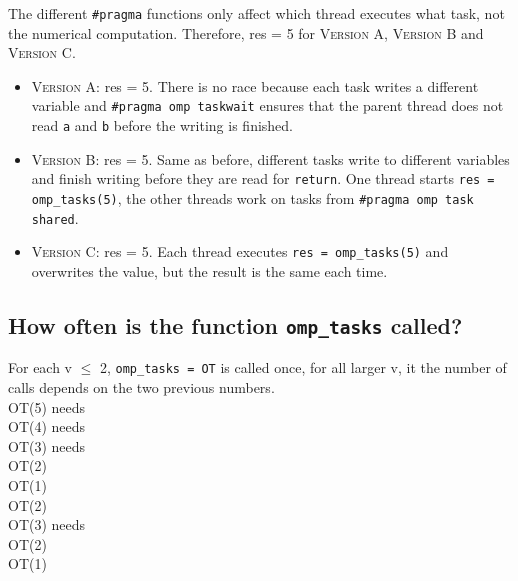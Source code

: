 \documentclass[a4paper,%
11pt,%
DIV12,
headsepline,%
headings=normal,
]{scrartcl}
\begin{document}
The different \texttt{\#pragma} functions only affect which thread executes what task, not the numerical computation. Therefore, res = 5 for \textsc{Version A}, \textsc{Version B} and \textsc{Version C}.

\begin{itemize}
	\item \textsc{Version A}: res = 5. There is no race because each task writes a different variable and \texttt{\#pragma omp taskwait} ensures that the parent thread does not read \texttt{a} and \texttt{b} before the writing is finished.
	\item \textsc{Version B}:  res = 5. Same as before, different tasks write to different variables and finish writing before they are read for \texttt{return}. One thread starts \texttt{res = omp\_tasks(5)}, the other threads work on tasks from \texttt{\#pragma omp task shared}.
	\item \textsc{Version C}:  res = 5. Each thread executes \texttt{res = omp\_tasks(5)} and overwrites the value, but the result is the same each time. 
\end{itemize}  

\subsection{How often is the function \texttt{omp\_tasks} called?}

For each v $\leq$ 2, \texttt{omp\_tasks = OT} is called once, for all larger v, it the number of calls depends on the two previous numbers. \\
OT(5) needs\\
\hspace*{5mm} OT(4) needs\\
\hspace*{10mm} OT(3) needs\\
\hspace*{15mm} OT(2)\\
\hspace*{15mm} OT(1)\\
\hspace*{10mm} OT(2)\\
\hspace*{5mm} OT(3) needs\\
\hspace*{10mm} OT(2)\\
\hspace*{10mm} OT(1)\\
\end{document}
